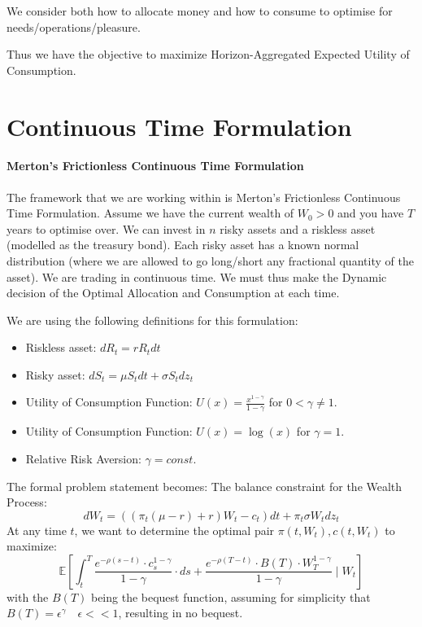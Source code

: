 \documentclass[11pt]{article}
\begin{document}
\maketitle
\thispagestyle{first}

We consider both how to allocate money and how to consume to optimise for needs/operations/pleasure.

Thus we have the objective to maximize Horizon-Aggregated Expected Utility of Consumption. 

\section*{Continuous Time Formulation}
\paragraph*{Merton's Frictionless Continuous Time Formulation}
The framework that we are working within is Merton's Frictionless Continuous Time Formulation. 
Assume we have the current wealth of $W_0>0$ and you have $T$ years to optimise over. We can invest in $n$ risky assets and a riskless asset (modelled as the treasury bond). Each risky asset has a known normal distribution (where we are allowed to go long/short any fractional quantity of the asset). We are trading in continuous time. We must thus make the Dynamic decision of the Optimal Allocation and Consumption at each time. 

We are using the following definitions for this formulation:
\begin{itemize}
    \item Riskless asset: $dR_t = rR_tdt$
    \item Risky asset: $dS_t = \mu S_t dt + \sigma S_t dz_t$
    \item Utility of Consumption Function: $U(x) = \frac{x^{1-\gamma}}{1-\gamma}$ for $0<\gamma\neq1$.
    \item Utility of Consumption Function: $U(x) = \log(x)$ for $\gamma = 1$. 
    \item Relative Risk Aversion: $\gamma = const$.
\end{itemize}

The formal problem statement becomes:
The balance constraint for the Wealth Process:
$$ 
dW_t = ((\pi_t(\mu - r) + r) W_t - c_t)dt + \pi_t \sigma W_t dz_t 
$$
At any time $t$, we want to determine the optimal pair $\pi(t, W_t), c(t, W_t)$ to maximize:
$$
\mathbb{E}\left[\int_t^T \frac{e^{-\rho(s-t)} \cdot c_s^{1-\gamma}}{1-\gamma} \cdot d s+\frac{e^{-\rho(T-t)} \cdot B(T) \cdot W_T^{1-\gamma}}{1-\gamma} \mid W_t\right]
$$
with the $B(T)$ being the bequest function, assuming for simplicity that $B(T) = \epsilon^\gamma\quad \epsilon << 1$, resulting in no bequest. 
\end{document}
